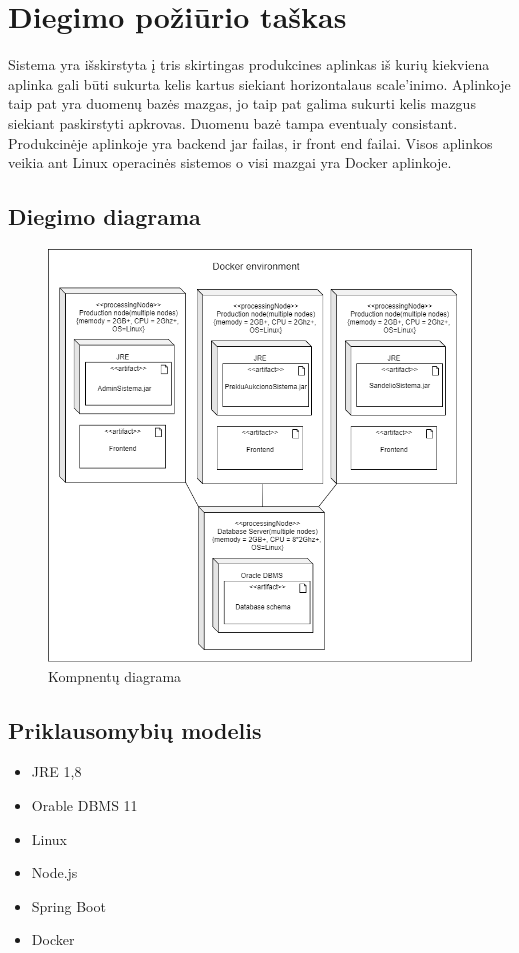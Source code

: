 \documentclass{VUMIFPSmagistrinis}
\begin{document}
		\section{Diegimo požiūrio taškas}
			Sistema yra išskirstyta į tris skirtingas produkcines aplinkas iš kurių kiekviena aplinka gali būti sukurta kelis kartus siekiant horizontalaus scale'inimo.
			Aplinkoje taip pat yra duomenų bazės mazgas, jo taip pat galima sukurti kelis mazgus siekiant paskirstyti apkrovas.
			Duomenu bazė tampa eventualy consistant.
			Produkcinėje aplinkoje yra backend jar failas, ir front end failai.
			Visos aplinkos veikia ant Linux operacinės sistemos o visi mazgai yra Docker aplinkoje.
			\subsection{Diegimo diagrama}
				\begin{figure}[H]
				\centering
				\includegraphics[scale=0.7]{img/deployment}
				\caption{Kompnentų diagrama} %
				\label{img:text}
				\end{figure}
			\subsection{Priklausomybių modelis}
				\begin{itemize}
					\item{JRE 1,8}
					\item{Orable DBMS 11}
					\item{Linux}
					\item{Node.js}
					\item{Spring Boot}
					\item{Docker}
				\end{itemize}
			
\end{document}
